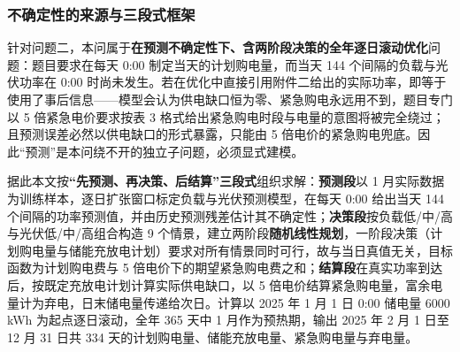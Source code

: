 
\subsubsection{不确定性的来源与三段式框架}

针对问题二，本问属于\textbf{在预测不确定性下、含两阶段决策的全年逐日滚动优化}问题：题目要求在每天 0:00 制定当天的计划购电量，而当天 144 个间隔的负载与光伏功率在 0:00 时尚未发生。若在优化中直接引用附件二给出的实际功率，即等于使用了事后信息——模型会认为供电缺口恒为零、紧急购电永远用不到，题目专门以 5 倍紧急电价要求按表 3 格式给出紧急购电时段与电量的意图将被完全绕过；且预测误差必然以供电缺口的形式暴露，只能由 5 倍电价的紧急购电兜底。因此“预测”是本问绕不开的独立子问题，必须显式建模。

据此本文按\textbf{“先预测、再决策、后结算”三段式}组织求解：\textbf{预测段}以 1 月实际数据为训练样本，逐日扩张窗口标定负载与光伏预测模型，在每天 0:00 给出当天 144 个间隔的功率预测值，并由历史预测残差估计其不确定性；\textbf{决策段}按负载低/中/高与光伏低/中/高组合构造 9 个情景，建立两阶段\textbf{随机线性规划}，一阶段决策（计划购电量与储能充放电计划）要求对所有情景同时可行，故与当日真值无关，目标函数为计划购电费与 5 倍电价下的期望紧急购电费之和；\textbf{结算段}在真实功率到达后，按既定充放电计划计算实际供电缺口，以 5 倍电价结算紧急购电量，富余电量计为弃电，日末储电量传递给次日。计算以 2025 年 1 月 1 日 0:00 储电量 6000 kWh 为起点逐日滚动，全年 365 天中 1 月作为预热期，输出 2025 年 2 月 1 日至 12 月 31 日共 334 天的计划购电量、储能充放电量、紧急购电量与弃电量。
